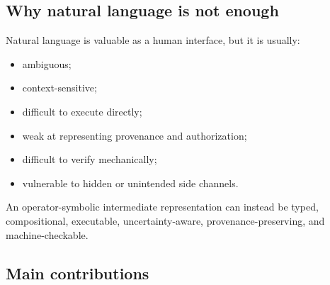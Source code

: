 \documentclass[11pt]{article}
\theoremstyle{definition}
\theoremstyle{remark}
\begin{document}
\subsection{Why natural language is not enough}

Natural language is valuable as a human interface, but it is usually:
\begin{itemize}[leftmargin=1.6em]
  \item ambiguous;
  \item context-sensitive;
  \item difficult to execute directly;
  \item weak at representing provenance and authorization;
  \item difficult to verify mechanically;
  \item vulnerable to hidden or unintended side channels.
\end{itemize}
An operator-symbolic intermediate representation can instead be typed, compositional, executable, uncertainty-aware, provenance-preserving, and machine-checkable.

\subsection{Main contributions}
\end{document}
